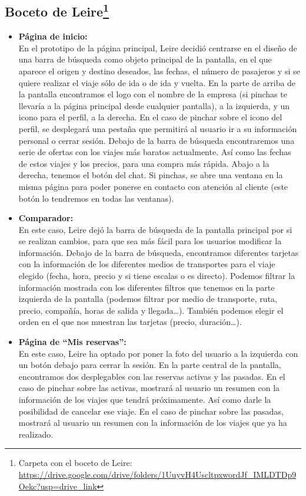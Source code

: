 \subsection[Boceto de Leire]{Boceto de Leire\footnote{Carpeta con el boceto de Leire: \url{https://drive.google.com/drive/folders/1UuyvH4UscltpxwordJf_IMLDTDp9Oekc?usp=drive_link}}}

\begin{itemize}
    \item\textbf{Página de inicio:} \\ En el prototipo de la página principal, Leire decidió centrarse en el diseño de una barra de búsqueda como objeto principal de la pantalla, en el que aparece el origen y destino deseados, las fechas, el número de pasajeros y si se quiere realizar el viaje sólo de ida o de ida y vuelta.
    En la parte de arriba de la pantalla encontramos el logo con el nombre de la empresa (si pinchas te llevaría a la página principal desde cualquier pantalla), a la izquierda, y un icono para el perfil, a la derecha.
    En el caso de pinchar sobre el icono del perfil, se desplegará una pestaña que permitirá al usuario ir a su información personal o cerrar sesión.
    Debajo de la barra de búsqueda encontraremos una serie de ofertas con los viajes más baratos actualmente. Así como las fechas de estos viajes y los precios, para una compra más rápida.
    Abajo a la derecha, tenemos el botón del chat. Si pinchas, se abre una ventana en la misma página para poder ponerse en contacto con atención al cliente (este botón lo tendremos en todas las ventanas).
    
    \item\textbf{Comparador:} \\ 
    En este caso, Leire dejó la barra de búsqueda de la pantalla principal por si se realizan cambios, para que sea más fácil para los usuarios modificar la información.
    Debajo de la barra de búsqueda, encontramos diferentes tarjetas con la información de los diferentes medios de transportes para el viaje elegido (fecha, hora, precio y si tiene escalas o es directo). Podemos filtrar la información mostrada con los diferentes filtros que tenemos en la parte izquierda de la pantalla (podemos filtrar por medio de transporte, ruta, precio, compañía, horas de salida y llegada…). También podemos elegir el orden en el que nos muestran las tarjetas (precio, duración…).
    
    \item\textbf{Página de ``Mis reservas'':} \\ En este caso, Leire ha optado por poner la foto del usuario a la izquierda con un botón debajo para cerrar la sesión.
    En la parte central de la pantalla, encontramos dos desplegables con las reservas activas y las pasadas.
    En el caso de pinchar sobre las activas, mostrará al usuario un resumen con la información de los viajes que tendrá próximamente. Así como darle la posibilidad de cancelar ese viaje.
    En el caso de pinchar sobre las pasadas, mostrará al usuario un resumen con la información de los viajes que ya ha realizado.
    

\end{itemize}
